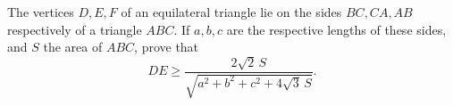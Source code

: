 The vertices $D, E, F$ of an equilateral triangle lie on the sides $BC, CA, AB$ respectively of a triangle $ABC$. If $a, b, c$ are the respective lengths of these sides, and $S$ the area of $ABC$, prove that
\[ DE \geq \frac{2\sqrt{2}\,S}{\sqrt{a^2 + b^2 + c^2 + 4\sqrt{3}\,S}}. \]
